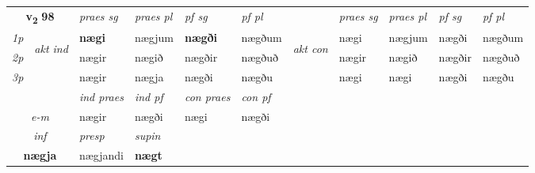 \noindent
\noindent
\begin{tabular}{lllllllllll} \toprule
\multicolumn{2}{c}{\textbf{v{\textsubscript{2}}} \Large{\textbf{98}}}  &  \textit{praes sg}  & \textit{praes pl}  &\textit{ pf sg} & \textit{pf pl} &  &  \textit{praes sg}  & \textit{praes pl}  & \textit{pf sg} & \textit{pf pl } \\*
	\cmidrule{3-6} \cmidrule{8-11}
 {\textit{1p}} & \multirow{3}{*}{\begin{turn}{90}\textit{akt ind}\end{turn}} & \textbf{nægi} & nægjum & \textbf{nægði} & nægðum & \multirow{3}{*}{\begin{turn}{90}\textit{akt con}\end{turn}} &nægi & nægjum & nægði & nægðum\\*
 {\textit{2p}} &  &  nægir  & nægið & nægðir & nægðuð & & nægir & nægið & nægðir & nægðuð \\*
{\textit{3p}} &  & nægir & nægja & nægði & nægðu & & nægi & nægi& nægði & nægðu \\*
\cmidrule{3-6} \cmidrule{8-11}

   & &  \textit{ind praes} & \textit{ind pf} & \textit{con praes} & \textit{con pf} \\*
\multicolumn{2}{c}{ \textit{e-m} } & nægir & nægði & nægi & nægði \\*

\cmidrule{3-4}
   \multicolumn{2}{c}{\textit{inf}}     & \textit{presp} & \textit{supin}   \\*
  \multicolumn{2}{c}{\textbf{nægja}}      & nægjandi &  \textbf{nægt}   \\*
\end{tabular}

